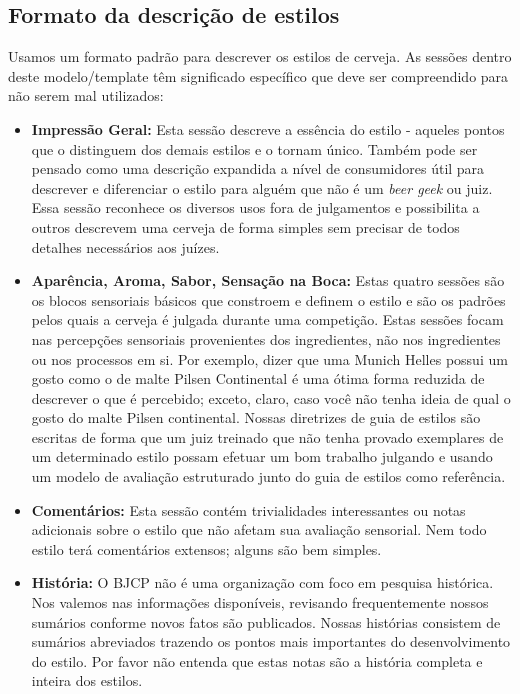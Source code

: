\subsection*{Formato da descrição de estilos}
Usamos um formato padrão para descrever os estilos de cerveja. As sessões dentro deste modelo/template têm significado específico que deve ser compreendido para não serem mal utilizados:
\begin{itemize}
\item \textbf{Impressão Geral:} Esta sessão descreve a essência do estilo - aqueles pontos que o distinguem dos demais estilos e o tornam único. Também pode ser pensado como uma descrição expandida a nível de consumidores útil para descrever e diferenciar o estilo para alguém que não é um \textit{beer geek} ou juiz. Essa sessão reconhece os diversos usos fora de julgamentos e possibilita a outros descrevem uma cerveja de forma simples sem precisar de todos detalhes necessários aos juízes.
\item \textbf{Aparência, Aroma, Sabor, Sensação na Boca:} Estas quatro sessões são os blocos sensoriais básicos que constroem e definem o estilo e são os padrões pelos quais a cerveja é julgada durante uma competição. Estas sessões focam nas percepções sensoriais provenientes dos ingredientes, não nos ingredientes ou nos processos em si. Por exemplo, dizer que uma Munich Helles possui um gosto como o de malte Pilsen Continental é uma ótima forma reduzida de descrever o que é percebido; exceto, claro, caso você não tenha ideia de qual o gosto do malte Pilsen continental. Nossas diretrizes de guia de estilos são escritas de forma que um juiz treinado que não tenha provado exemplares de um determinado estilo possam efetuar um bom trabalho julgando e usando um modelo de avaliação estruturado junto do guia de estilos como referência.
\item \textbf{Comentários:} Esta sessão contém trivialidades interessantes ou notas adicionais sobre o estilo que não afetam sua avaliação sensorial. Nem todo estilo terá comentários extensos; alguns são bem simples.
\item \textbf{História:} O BJCP não é uma organização com foco em pesquisa histórica. Nos valemos nas informações disponíveis, revisando frequentemente nossos sumários conforme novos fatos são publicados. Nossas histórias consistem de sumários abreviados trazendo os pontos mais importantes do desenvolvimento do estilo. Por favor não entenda que estas notas são a história completa e inteira dos estilos.

\end{itemize}

